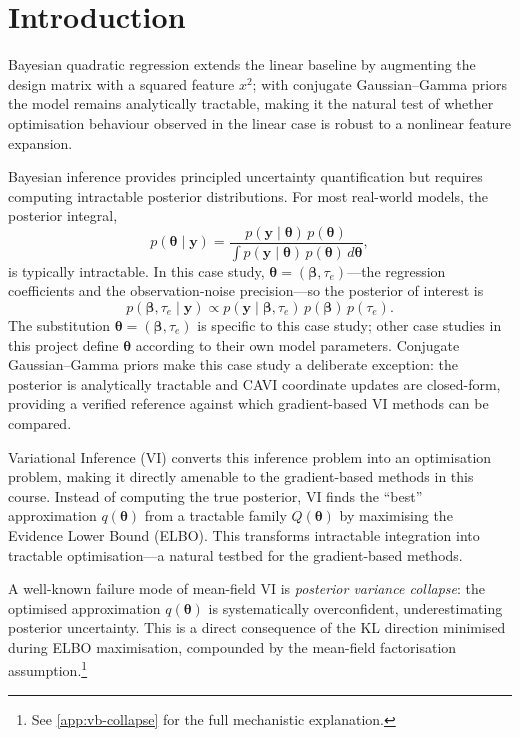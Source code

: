 \documentclass[11pt,a4paper]{article}
\begin{document}
\newpage
\section{Introduction}

Bayesian quadratic regression extends the linear baseline by augmenting the design matrix
with a squared feature $x^2$; with conjugate Gaussian--Gamma priors the model remains
analytically tractable, making it the natural test of whether optimisation behaviour
observed in the linear case is robust to a nonlinear feature expansion.

Bayesian inference provides principled uncertainty quantification but requires computing
intractable posterior distributions. For most real-world models, the posterior integral,
\begin{equation*}
  p(\bm{\theta} \mid \bm{y}) = \frac{p(\bm{y} \mid \bm{\theta})\,p(\bm{\theta})}
    {\displaystyle\int p(\bm{y} \mid \bm{\theta})\,p(\bm{\theta})\,d\bm{\theta}},
\end{equation*}
is typically intractable.
In this case study, $\bm{\theta} = (\bm{\beta}, \tau_e)$---the regression coefficients
and the observation-noise precision---so the posterior of interest is
\begin{equation*}
  p(\bm{\beta}, \tau_e \mid \bm{y}) \propto p(\bm{y} \mid \bm{\beta}, \tau_e)\,p(\bm{\beta})\,p(\tau_e).
\end{equation*}
The substitution $\bm{\theta} = (\bm{\beta}, \tau_e)$ is specific to this case study;
other case studies in this project define $\bm{\theta}$ according to their own model parameters.
Conjugate Gaussian--Gamma priors make this case study a deliberate exception: the posterior
is analytically tractable and CAVI coordinate updates are closed-form, providing a verified
reference against which gradient-based VI methods can be compared.

Variational Inference (VI) converts this inference problem into an optimisation problem,
making it directly amenable to the gradient-based methods in this course.
Instead of computing the true posterior, VI finds the ``best'' approximation $q(\bm{\theta})$
from a tractable family $Q(\bm{\theta})$ by maximising the Evidence Lower Bound (ELBO).
This transforms intractable integration into tractable optimisation---a natural testbed for
the gradient-based methods.

A well-known failure mode of mean-field VI is \emph{posterior variance collapse}:
the optimised approximation $q(\bm{\theta})$ is systematically overconfident,
underestimating posterior uncertainty. This is a direct consequence of the KL direction minimised during ELBO maximisation,
compounded by the mean-field factorisation assumption.\footnote{See \ref{app:vb-collapse} for the full mechanistic explanation.}
\end{document}
